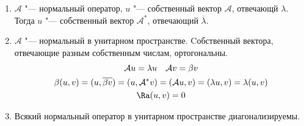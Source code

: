 \begin{conseq}
	\begin{enumerate}
	\item
		$\mathcal A$ "--- нормальный оператор, $u$ "--- собственный вектор $\mathcal A$, отвечающй  $\lambda$.
		Тогда $u$ "--- собственный вектор $\mathcal{A}^*$, отвечающий $\overline{\lambda}$.
	
	\item
		$\mathcal A$ "--- нормальный в унитарном пространстве.
		Cобственный вектора, отвечающие разным собственным числам, ортогональны.
		\begin{gather*}
			\mathcal Au = \lambda u \quad \mathcal Av = \beta v \\
			\beta(u, v) = (u, \overline{\beta v}) = (u, \mathcal{A}^*v) = (\mathcal Au, v) = (\lambda u, v) = \lambda (u, v) \\
			\Ra (u, v) = 0
		\end{gather*}
	
	\item
		Всякий нормальный оператор в унитарном пространстве диагонализируемы.
	\end{enumerate}
\end{conseq}


